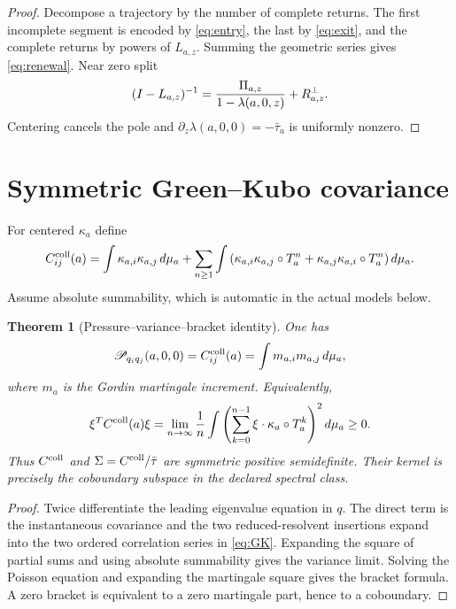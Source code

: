 \documentclass[11pt,reqno]{amsart}
\newtheorem{theorem}{Theorem}[section]
\theoremstyle{definition}
\theoremstyle{remark}
\newcommand{\Piop}{\Pi}
\begin{document}
\begin{proof}
Decompose a trajectory by the number of complete returns.  The first
incomplete segment is encoded by \eqref{eq:entry}, the last by
\eqref{eq:exit}, and the complete returns by powers of $L_{a,z}$.  Summing the
geometric series gives \eqref{eq:renewal}.  Near zero split
\[
 (I-L_{a,z})^{-1}=
 {\Piop_{a,z}\over1-\lambda(a,0,z)}+R_{a,z}^{\perp}.
\]
Centering cancels the pole and
$\partial_z\lambda(a,0,0)=-\bar\tau_a$ is uniformly nonzero.
\end{proof}

\section{Symmetric Green--Kubo covariance}

For centered $\kappa_a$ define
\begin{equation}\label{eq:GK}
 C_{ij}^{\rm coll}(a)=
 \int\kappa_{a,i}\kappa_{a,j}\,d\mu_a
 +\sum_{n\ge1}\int\left(
 \kappa_{a,i}\kappa_{a,j}\circ T_a^n+
 \kappa_{a,j}\kappa_{a,i}\circ T_a^n
 \right)d\mu_a.
\end{equation}
Assume absolute summability, which is automatic in the actual models below.

\begin{theorem}[Pressure--variance--bracket identity]\label{thm:GK}
One has
\begin{equation}\label{eq:GK-identities}
 \mathscr P_{q_iq_j}(a,0,0)=C_{ij}^{\rm coll}(a)
 =\int m_{a,i}m_{a,j}\,d\mu_a,
\end{equation}
where $m_a$ is the Gordin martingale increment.  Equivalently,
\[
 \xi^TC^{\rm coll}(a)\xi
 =\lim_{n\to\infty}{1\over n}
 \int\left(\sum_{k=0}^{n-1}
 \xi\cdot\kappa_a\circ T_a^k\right)^2d\mu_a\ge0.
\]
Thus $C^{\rm coll}$ and $\Sigma=C^{\rm coll}/\bar\tau$ are symmetric positive
semidefinite.  Their kernel is precisely the coboundary subspace in the
declared spectral class.
\end{theorem}

\begin{proof}
Twice differentiate the leading eigenvalue equation in $q$.  The direct term
is the instantaneous covariance and the two reduced-resolvent insertions
expand into the two ordered correlation series in \eqref{eq:GK}.  Expanding
the square of partial sums and using absolute summability gives the variance
limit.  Solving the Poisson equation and expanding the martingale square gives
the bracket formula.  A zero bracket is equivalent to a zero martingale part,
hence to a coboundary.
\end{proof}
\end{document}
